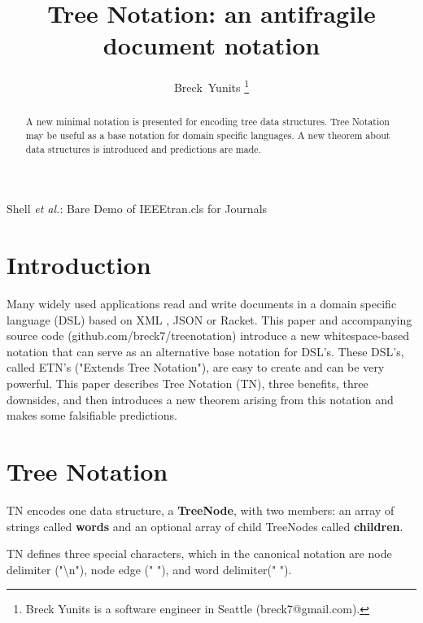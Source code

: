 \documentclass[journal]{IEEEtran}
\begin{document}
\title{Tree Notation: an antifragile document notation}

\author{Breck~Yunits%
\thanks{Breck Yunits is a software engineer in Seattle (breck7@gmail.com).}%
}

%
{Shell \MakeLowercase{\textit{et al.}}: Bare Demo of IEEEtran.cls for Journals}

\maketitle


\begin{abstract}
A new minimal notation is presented for encoding tree data structures. Tree Notation may be useful as a base notation for domain specific languages. A new theorem about data structures is introduced and predictions are made.

\end{abstract}

\IEEEpeerreviewmaketitle

\section{Introduction}

Many widely used applications read and write documents in a domain specific language (DSL) based on XML \cite{Bray}, JSON \cite{Crockford} or Racket. This paper and accompanying source code (github.com/breck7/treenotation) introduce a new whitespace-based notation that can serve as an alternative base notation for DSL's. These DSL's, called ETN's ("Extends Tree Notation"), are easy to create and can be very powerful. This paper describes Tree Notation (TN), three benefits, three downsides, and then introduces a new theorem arising from this notation and makes some falsifiable predictions.

\section{Tree Notation}

TN encodes one data structure, a \textbf{TreeNode}, with two members: an array of strings called \textbf{words} and an optional array of child TreeNodes called \textbf{children}.

TN defines three special characters, which in the canonical notation are node delimiter ("\textbackslash n"), node edge (" "), and word delimiter(" ").
\end{document}
